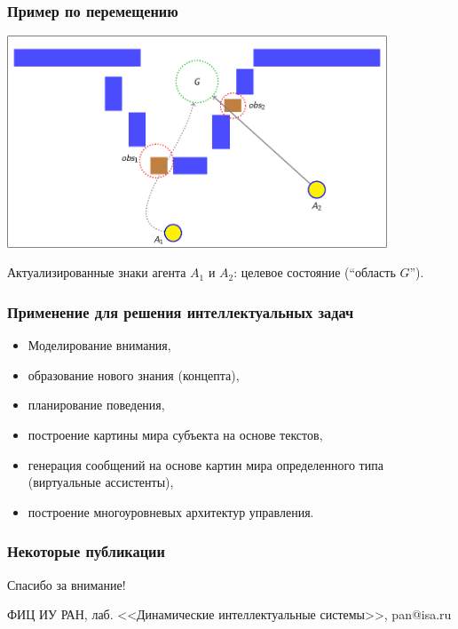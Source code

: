 \documentclass[default]{beamer}
\renewcommand*{\bibfont}{\footnotesize}
\begin{document}
	\begin{frame}
		\frametitle{Пример по перемещению}
		
		\begin{center}
			\includegraphics[page=171,width=0.85\textwidth]{examples/slides_colored}
		\end{center}
		\par\bigskip
		Актуализированные знаки агента $A_1$ и $A_2$: целевое состояние (``область $G$'').
	\end{frame}
			
	\begin{frame}
		\frametitle{Применение для решения интеллектуальных задач}
		
		\begin{itemize}
			\item Моделирование внимания,
			\item образование нового знания (концепта),
			\item планирование поведения,
			\item построение картины мира субъекта на основе текстов,
			\item генерация сообщений на основе картин мира определенного типа (виртуальные ассистенты),
			\item построение многоуровневых архитектур управления.
		\end{itemize}
	\end{frame}

	\begin{frame}
		\frametitle{Некоторые публикации}
		\renewcommand*{\bibfont}{\tiny}
		\nocite{*}
		\printbibliography
	\end{frame}

	\begin{frame}
		\centering
		\Huge
		Спасибо за внимание!
		\normalsize
		\par\bigskip
		\par\bigskip
		ФИЦ ИУ РАН, лаб. <<Динамические интеллектуальные системы>>, pan@isa.ru
	\end{frame}
\end{document}
